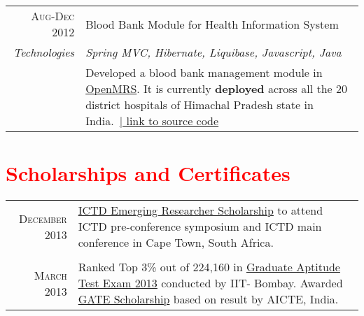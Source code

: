 \documentclass[a4paper,11pt]{article} %
\begin{document}
\begin{longtable}{r|p{15cm}}

\textsc{Aug-Dec 2012} & Blood Bank Module for Health Information System\\
\emph{Technologies} & \emph{Spring MVC, Hibernate, Liquibase, Javascript, Java }\\ 
& \small{Developed a blood bank management module in \href{http://openmrs.org/}{OpenMRS}. It is currently \textbf{deployed} across all the 20 district hospitals of Himachal Pradesh state in India.}\ \href{https://github.com/hispindia/bloodbank}{\hfill | link to source code}
\end{longtable}



\section{ \texorpdfstring{\textcolor{red}{Scholarships and Certificates}}{Scholarships and Certificates} }
\begin{tabular}{rp{13cm}}

\textsc{December} 2013 & \href{http://ictd.cs.uct.ac.za/attending-scholarships.html#preconference}{ICTD Emerging Researcher Scholarship} to attend ICTD  pre-conference symposium and ICTD main conference in Cape Town, South Africa. \normalsize\\ \\

\textsc{March} 2013 & Ranked Top 3\% out of 224,160 in \href{http://www.gate.iitb.ac.in/gate2013/}{Graduate Aptitude Test Exam 2013} conducted by IIT- Bombay. Awarded \href{http://www.aicte-india.org/generalInstructions.php}{GATE Scholarship} based on result by AICTE, India.\normalsize\\


\end{tabular}

\end{document}
